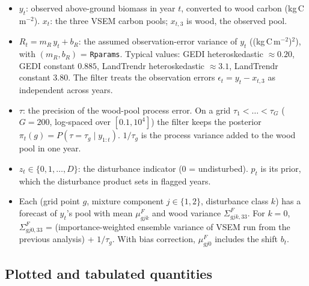 \documentclass[11pt]{article}
\newcommand{\code}[1]{\texttt{#1}}
\begin{document}
\begin{itemize}
  \item $y_t$: observed above-ground biomass in year $t$, converted to wood carbon
  (kg\,C\,m$^{-2}$). $x_t$: the three VSEM carbon pools; $x_{t,3}$ is wood, the observed pool.
  \item $R_t = m_R\,y_t + b_R$: the assumed observation-error variance of $y_t$
  ((kg\,C\,m$^{-2}$)$^2$), with $(m_R, b_R)$ = \code{Rparams}. Typical values: GEDI heteroskedastic
  $\approx 0.20$, GEDI constant $0.885$, LandTrendr heteroskedastic $\approx 3.1$, LandTrendr
  constant $3.80$. The filter treats the observation errors $\epsilon_t = y_t - x_{t,3}$ as
  independent across years.
  \item $\tau$: the precision of the wood-pool process error. On a grid $\tau_1 < \dots < \tau_G$
  ($G = 200$, log-spaced over $[0.1, 10^4]$) the filter keeps the posterior
  $\pi_t(g) = P(\tau = \tau_g \mid y_{1:t})$. $1/\tau_g$ is the process variance added to the wood
  pool in one year.
  \item $z_t \in \{0, 1, \dots, D\}$: the disturbance indicator ($0$ = undisturbed). $p_t$ is
  its prior, which the disturbance product sets in flagged years.
  \item Each (grid point $g$, mixture component $j \in \{1,2\}$, disturbance class $k$) has a forecast
  of $y_t$'s pool with mean $\mu^F_{gjk}$ and wood variance $\Sigma^F_{gjk,33}$. For
  $k = 0$, $\Sigma^F_{gj0,33}$ = (importance-weighted ensemble variance of VSEM run from the
  previous analysis) + $1/\tau_g$. With bias correction, $\mu^F_{gj0}$ includes the shift
  $b_t$.
\end{itemize}

\subsection{Plotted and tabulated quantities}
\label{sec:pred0}
\end{document}
